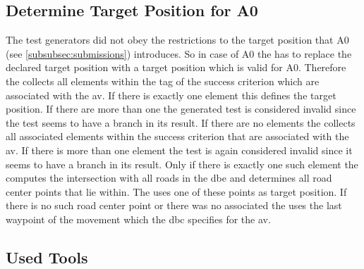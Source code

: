 \FloatBarrier%
\subsection{Determine Target Position for A0}\label{subsec:targetPositionDetermination}
The test generators did not obey the restrictions to the target position that A0 (see \cref{subsubsec:submissions}) introduces.
So in case of A0 the \submissiontester{} has to replace the declared target position with a target position which is valid for A0.
Therefore the \submissiontester{} collects all  elements within the tag of the success criterion which are associated with the \gls{av}.
If there is exactly one element this defines the target position.
If there are more than one the generated test is considered invalid since the test seems to have a branch in its result.
If there are no  elements the \submissiontester{} collects all associated  elements within the success criterion that are associated with the \gls{av}.
If there is more than one element the test is again considered invalid since it seems to have a branch in its result.
Only if there is exactly one such element the \submissiontester{} computes the intersection with all roads in the \gls{dbe} and determines all road center points that lie within.
The \submissiontester{} uses one of these points as target position.
If there is no such road center point or there was no associated  the \submissiontester{} uses the last waypoint of the movement which the \gls{dbc} specifies for the \gls{av}.

\FloatBarrier%
\subsection{Used Tools}
